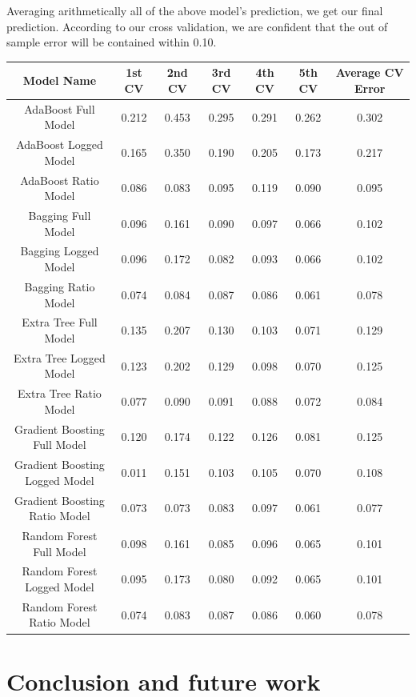 \documentclass{article}
\begin{document}
Averaging arithmetically all of the above model’s prediction, we get our final prediction. According to our cross validation, we are confident that the out of sample error will be contained within 0.10.


\begin{center}
 \begin{tabular}{||c c c c c c c||} 
 \hline
 Model Name & 1st CV & 2nd CV & 3rd CV & 4th CV & 5th CV & Average CV Error \\ [0.5ex] 
 \hline\hline
 AdaBoost Full Model & 0.212 & 0.453 & 0.295 & 0.291 & 0.262 & 0.302 \\ 
 \hline
 AdaBoost Logged Model & 0.165 & 0.350 & 0.190 & 0.205 & 0.173 & 0.217 \\ 
 \hline
 AdaBoost Ratio Model & 0.086 & 0.083 & 0.095 & 0.119 & 0.090 & 0.095 \\ 
 \hline
  Bagging Full Model & 0.096 & 0.161 & 0.090 & 0.097 & 0.066 & 0.102 \\ 
 \hline
  Bagging Logged Model & 0.096 & 0.172 & 0.082 & 0.093 & 0.066 & 0.102 \\ 
 \hline
  Bagging Ratio Model & 0.074 & 0.084 & 0.087 & 0.086 & 0.061 & 0.078 \\ 
 \hline
  Extra Tree Full Model & 0.135 & 0.207 & 0.130 & 0.103 & 0.071 & 0.129 \\ 
 \hline
  Extra Tree Logged Model & 0.123 & 0.202 & 0.129 & 0.098 & 0.070 & 0.125 \\ 
 \hline
  Extra Tree Ratio Model & 0.077 & 0.090 & 0.091 & 0.088 & 0.072 & 0.084 \\ 
 \hline
   Gradient Boosting Full Model & 0.120 & 0.174 & 0.122 & 0.126 & 0.081 & 0.125 \\ 
 \hline
   Gradient Boosting Logged Model & 0.011 & 0.151 & 0.103 & 0.105 & 0.070 & 0.108 \\ 
 \hline
   Gradient Boosting Ratio Model & 0.073 & 0.073 & 0.083 & 0.097 & 0.061 & 0.077 \\ 
 \hline
   Random Forest Full Model & 0.098 & 0.161 & 0.085 & 0.096 & 0.065 & 0.101 \\ 
 \hline
   Random Forest Logged Model & 0.095 & 0.173 & 0.080 & 0.092 & 0.065 & 0.101 \\ 
 \hline
   Random Forest Ratio Model & 0.074 & 0.083 & 0.087 & 0.086 & 0.060 & 0.078 \\ [1ex] 
 \hline
\end{tabular}
\end{center}

\section{Conclusion and future work}
\end{document}
